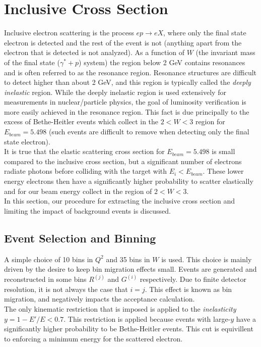 \section{Inclusive Cross Section}
Inclusive electron scattering is the process $e p \rightarrow e X$, where only the final state electron is detected and the rest of the event is not (anything apart from the electron that is detected is not analyzed).  As a function of $W$ (the invariant mass of the final state ($\gamma^* + p$) system) the region below 2 GeV contains resonances and is often referred to as the resonance region.  Resonance structures are difficult to detect higher than about 2 GeV, and this region is typically called the \textit{deeply inelastic} region.  While the deeply inelastic region is used extensively for measurements in nuclear/particle physics, the goal of luminosity verification is more easily achieved in the resonance region.  This fact is due principally to the excess of Bethe-Heitler events which collect in the $2 < W < 3$ region for $E_{beam} = 5.498$ (such events are difficult to remove when detecting only the final state electron). \\
It is true that the elastic scattering cross section for $E_{beam} = 5.498$ is small compared to the inclusive cross section, but a significant number of electrons radiate photons before colliding with the target with $E_{i} < E_{beam}$.  These lower energy electrons then have a significantly higher probability to scatter elastically and for our beam energy collect in the region of $2 < W < 3$.\\
In this section, our procedure for extracting the inclusive cross section and limiting the impact of background events is discussed.

\subsection{Event Selection and Binning}
A simple choice of 10 bins in $Q^2$ and 35 bins in $W$ is used.  This choice is mainly driven by the desire to keep bin migration effects small.  Events are generated and reconstructed in some bins $R^{(j)}$ and $G^{(i)}$ respectively.  Due to finite detector resolution, it is not always the case that $i = j$.  This effect is known as bin migration, and negatively impacts the acceptance calculation.\\
The only kinematic restriction that is imposed is applied to the \textit{inelasticity} $y = 1-E'/E < 0.7$.  This restriction is applied because events with large-$y$ have a significantly higher probability to be Bethe-Heitler events.  This cut is equivillent to enforcing a minimum energy for the scattered electron.


